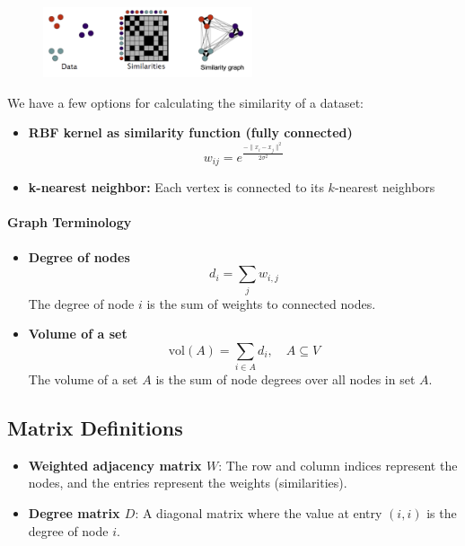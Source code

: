 \documentclass[11pt]{article}
\begin{document}
\begin{figure}[h]
	\centering
	\includegraphics[width=0.55\textwidth]{../imgs/sim-graph.png} %
\end{figure}

We have a few options for calculating the similarity of a dataset:

\begin{itemize}
	\item \textbf{RBF kernel as similarity function (fully connected)} \hfill
	      \[
		      w_{ij} = e^{\frac{-\|x_i - x_j\|^2}{2\sigma^2}}
	      \]

	\item \textbf{k-nearest neighbor:} Each vertex is connected to its \( k \)-nearest neighbors
\end{itemize}

\paragraph*{Graph Terminology}

\begin{itemize}
	\item \textbf{Degree of nodes}
	      \[
		      d_i = \sum_j w_{i,j}
	      \]
	      The degree of node \(i\) is the sum of weights to connected nodes.

	\item \textbf{Volume of a set}
	      \[
		      \text{vol}(A) = \sum_{i \in A} d_i, \quad A \subseteq V
	      \]
	      The volume of a set \(A\) is the sum of node degrees over all nodes in set \(A\).
\end{itemize}

\vspace{1em}

\subsection*{Matrix Definitions}

\begin{itemize}
	\item \textbf{Weighted adjacency matrix \(W\)}:
	      The row and column indices represent the nodes, and the entries represent the weights (similarities).

	\item \textbf{Degree matrix \(D\)}:
	      A diagonal matrix where the value at entry \((i, i)\) is the degree of node \(i\).
\end{itemize}
\end{document}
